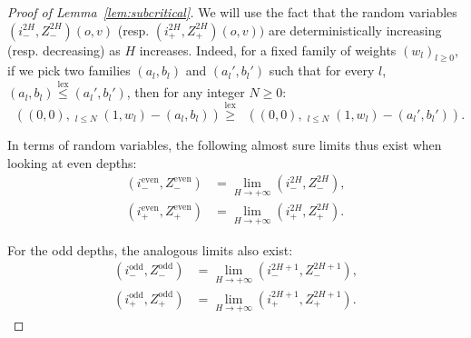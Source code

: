 \documentclass[11pt]{article}
\DeclareMathOperator{\lex}{lex}
\DeclareMathOperator*{\maxlex}{\overset{\lex}{\max}}
\begin{document}
\begin{proof}[Proof of Lemma~\ref{lem:subcritical}]
We will use the fact that the random variables $(i_-^{2H},Z_-^{2H}) (o,v)$  (resp. $(i_+^{2H},Z_+^{2H}) (o,v))$ are deterministically increasing (resp. decreasing) as $H$ increases.
Indeed, for a fixed family of weights $(w_l)_{l \geq 0}$, if we pick two families $(a_l,b_l)$ and $(a_l',b_l')$ such that for every $l$, $(a_l,b_l) \overset{\lex}{\leq} (a_l',b_l')$, then for any integer $N \geq 0$:
\[ \maxlex\left( (0,0) ,\maxlex_{l \leq N} (1,w_l)-(a_l,b_l)\right) \overset{\lex}{\geq} \maxlex\left( (0,0), \maxlex_{l \leq N} (1,w_l)-(a_l',b_l')\right). \]

In terms of random variables, the following almost sure limits thus exist when looking at even depths:
\begin{align*}
    (i_{-}^{\text{even}},Z_{-}^{\text{even}}) &= \lim_{H \rightarrow +\infty} (i_{-}^{2H},Z_{-}^{2H}) ,\\
    (i_{+}^{\text{even}},Z_{+}^{\text{even}}) &= \lim_{H \rightarrow +\infty} (i_{+}^{2H},Z_{+}^{2H}).
\end{align*}

For the odd depths, the analogous limits also exist:
\begin{align*}
    (i_{-}^{
    \text{odd}},Z_{-}^{
    \text{odd}}) &= \lim_{H \rightarrow +\infty} (i_-^{2H+1},Z_{-}^{2H+1}), \\
    (i_{+}^{
    \text{odd}},Z_{+}^{\text{odd}}) &= \lim_{H \rightarrow +\infty} (i_{+}^{2H+1}, Z_{+}^{2H+1}).
\end{align*}


\end{proof}
\end{document}
